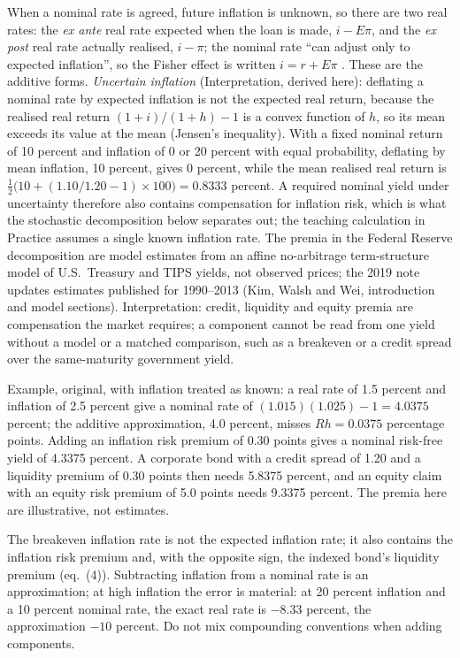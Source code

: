 \begin{qfdefinition}
 When a nominal rate is agreed, future inflation is unknown, so there are two real rates: the \emph{ex ante} real rate expected when the loan is made, $i-E\pi$, and the \emph{ex post} real rate actually realised, $i-\pi$; the nominal rate ``can adjust only to expected inflation'', so the Fisher effect is written $i=r+E\pi$ \citep[chap.~5, sec.~5-3]{macroeconomics-2019}. These are the additive forms. \emph{Uncertain inflation} (Interpretation, derived here): deflating a nominal rate by expected inflation is not the expected real return, because the realised real return $(1+i)/(1+h)-1$ is a convex function of $h$, so its mean exceeds its value at the mean (Jensen's inequality). With a fixed nominal return of 10 percent and inflation of 0 or 20 percent with equal probability, deflating by mean inflation, 10 percent, gives 0 percent, while the mean realised real return is $\tfrac12\bigl(10+(1.10/1.20-1)\times100\bigr)=0.8333$ percent. A required nominal yield under uncertainty therefore also contains compensation for inflation risk, which is what the stochastic decomposition below separates out; the teaching calculation in Practice assumes a single known inflation rate. The premia in the Federal Reserve decomposition are model estimates from an affine no-arbitrage term-structure model of U.S.\ Treasury and TIPS yields, not observed prices; the 2019 note updates estimates published for 1990--2013 (Kim, Walsh and Wei, introduction and model sections). Interpretation: credit, liquidity and equity premia are compensation the market requires; a component cannot be read from one yield without a model or a matched comparison, such as a breakeven or a credit spread over the same-maturity government yield.

 Example, original, with inflation treated as known: a real rate of 1.5 percent and inflation of 2.5 percent give a nominal rate of $(1.015)(1.025)-1=4.0375$ percent; the additive approximation, 4.0 percent, misses $Rh=0.0375$ percentage points. Adding an inflation risk premium of 0.30 points gives a nominal risk-free yield of 4.3375 percent. A corporate bond with a credit spread of 1.20 and a liquidity premium of 0.30 points then needs 5.8375 percent, and an equity claim with an equity risk premium of 5.0 points needs 9.3375 percent. The premia here are illustrative, not estimates.

 The breakeven inflation rate is not the expected inflation rate; it also contains the inflation risk premium and, with the opposite sign, the indexed bond's liquidity premium (eq.~(4)). Subtracting inflation from a nominal rate is an approximation; at high inflation the error is material: at 20 percent inflation and a 10 percent nominal rate, the exact real rate is $-8.33$ percent, the approximation $-10$ percent. Do not mix compounding conventions when adding components.


\end{qfdefinition}
